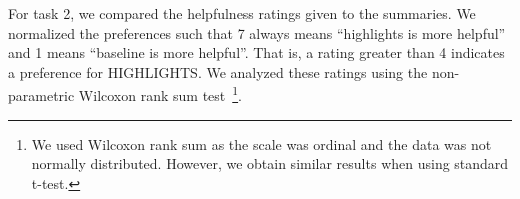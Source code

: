 For task 2, we compared the helpfulness ratings given to the summaries. We normalized the preferences such that 7 always means ``highlights is more helpful'' and 1 means ``baseline is more helpful''. That is, a rating greater than 4 indicates a preference for HIGHLIGHTS. We analyzed these ratings using the non-parametric Wilcoxon rank sum test~\footnote{We used Wilcoxon rank sum as the scale was ordinal and the data was not normally distributed. However, we obtain similar results when using standard t-test.}.




